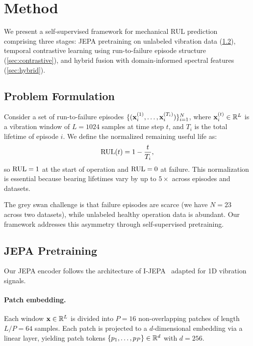 \section{Method}
\label{sec:method}

We present a self-supervised framework for mechanical RUL prediction comprising three stages: JEPA pretraining on unlabeled vibration data (\cref{sec:jepa}), temporal contrastive learning using run-to-failure episode structure (\cref{sec:contrastive}), and hybrid fusion with domain-informed spectral features (\cref{sec:hybrid}).

\subsection{Problem Formulation}
\label{sec:problem}

Consider a set of run-to-failure episodes $\{(\mathbf{x}_i^{(1)}, \ldots, \mathbf{x}_i^{(T_i)})\}_{i=1}^N$, where $\mathbf{x}_i^{(t)} \in \mathbb{R}^{L}$ is a vibration window of $L = 1024$ samples at time step $t$, and $T_i$ is the total lifetime of episode $i$. We define the normalized remaining useful life as:
\begin{equation}
  \text{RUL}(t) = 1 - \frac{t}{T_i},
  \label{eq:rul}
\end{equation}
so $\text{RUL} = 1$ at the start of operation and $\text{RUL} = 0$ at failure. This normalization is essential because bearing lifetimes vary by up to $5\times$ across episodes and datasets.

The grey swan challenge is that failure episodes are scarce (we have $N = 23$ across two datasets), while unlabeled healthy operation data is abundant. Our framework addresses this asymmetry through self-supervised pretraining.

\subsection{JEPA Pretraining}
\label{sec:jepa}

Our JEPA encoder follows the architecture of I-JEPA~\citep{assran2023ijepa} adapted for 1D vibration signals.

\paragraph{Patch embedding.} Each window $\mathbf{x} \in \mathbb{R}^L$ is divided into $P = 16$ non-overlapping patches of length $L/P = 64$ samples. Each patch is projected to a $d$-dimensional embedding via a linear layer, yielding patch tokens $\{p_1, \ldots, p_P\} \in \mathbb{R}^d$ with $d = 256$.

